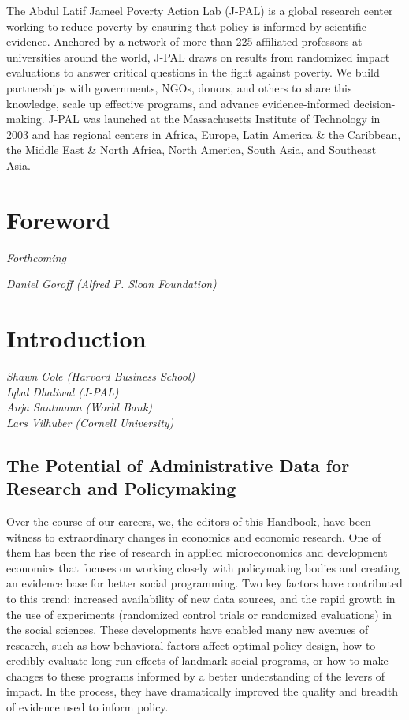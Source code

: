 \documentclass[
]{WileySix}
\begin{document}
The Abdul Latif Jameel Poverty Action Lab (J-PAL) is a global research center working to reduce poverty by ensuring that policy is informed by scientific evidence. Anchored by a network of more than 225 affiliated professors at universities around the world, J-PAL draws on results from randomized impact evaluations to answer critical questions in the fight against poverty. We build partnerships with governments, NGOs, donors, and others to share this knowledge, scale up effective programs, and advance evidence-informed decision-making. J-PAL was launched at the Massachusetts Institute of Technology in 2003 and has regional centers in Africa, Europe, Latin America \& the Caribbean, the Middle East \& North Africa, North America, South Asia, and Southeast Asia.

\hypertarget{foreword}{%
\section*{Foreword}\label{foreword}}

\emph{Forthcoming}

\emph{Daniel Goroff (Alfred P. Sloan Foundation)}

\hypertarget{intro}{%
\section{Introduction}\label{intro}}

\emph{Shawn Cole (Harvard Business School)}\\
\emph{Iqbal Dhaliwal (J-PAL)}\\
\emph{Anja Sautmann (World Bank)}\\
\emph{Lars Vilhuber (Cornell University)}

\hypertarget{the-potential-of-administrative-data-for-research-and-policymaking}{%
\subsection{The Potential of Administrative Data for Research and Policymaking}\label{the-potential-of-administrative-data-for-research-and-policymaking}}

Over the course of our careers, we, the editors of this Handbook, have been witness to extraordinary changes in economics and economic research. One of them has been the rise of research in applied microeconomics and development economics that focuses on working closely with policymaking bodies and creating an evidence base for better social programming. Two key factors have contributed to this trend: increased availability of new data sources, and the rapid growth in the use of experiments (randomized control trials or randomized evaluations) in the social sciences. These developments have enabled many new avenues of research, such as how behavioral factors affect optimal policy design, how to credibly evaluate long-run effects of landmark social programs, or how to make changes to these programs informed by a better understanding of the levers of impact. In the process, they have dramatically improved the quality and breadth of evidence used to inform policy.
\end{document}
